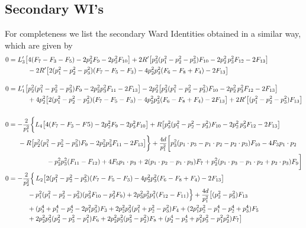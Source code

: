 \documentclass[a4paper,11pt,openright,twoside]{book}
\newcommand{\sdfrac}[2]{\mbox{\small$\displaystyle\frac{#1}{#2}$}}
\numberwithin{equation}{section}
\begin{document}
{{\subsection{Secondary WI's}
For completeness we list the secondary Ward Identities obtained in a similar way, which are given by
\begin{align}
	0&=L'_3\big[4(F_7-F_3-F_5)-2p_2^2F_9-2p_3^2F_{10}\big]+2R'\big[p_3^2(p_1^2-p_2^2-p_3^2)F_{10}-2p_2^2\,p_3^2 F_{12}-2F_{13}\big]\notag\\
	&\hspace{1cm}-2R'\big[2(p_1^2-p_2^2-p_3^2)(F_7-F_5-F_3)-4p_2^2p_3^2(F_6-F_8+F_4)-2F_{13}\big]\\[2.5ex]
	0&=L'_1\big[p_2^2(p_1^2-p_2^2-p_3^2)F_9-2p_2^2p_3^2F_{11}-2F_{13}\big]-2p_2^2\big[p_3^2(p_1^2-p_2^2-p_3^2)F_{10}-2p_2^2\,p_3^2 F_{12}-2F_{13}\big]\notag\\
	&\hspace{1cm}+4p_2^2\big[2(p_1^2-p_2^2-p_3^2)(F_7-F_5-F_3)-4p_2^2p_3^2(F_6-F_8+F_4)-2F_{13}\big]+2R'\big[(p_1^2-p_2^2-p_3^2)F_{13}\big]\notag\\[2.5ex]
\end{align}
\begin{align}
	0&=-\sdfrac{2}{p_1^2}\bigg\{L_4\big[4(F_7-F_3-F5)-2p_2^2F_9-2p_3^2F_{10}\big]+R\big[p_3^2(p_1^2-p_2^2-p_3^2)F_{10}-2p_2^2\,p_3^2 F_{12}-2F_{13}\big]\notag\\
	&\hspace{0.5cm}-R\big[p_2^2(p_1^2-p_2^2-p_3^2)F_9-2p_2^2p_3^2F_{11}-2F_{13}\big]\bigg\}+\sdfrac{4d}{p_1^2}\bigg[p_3^2(p_1\cdot p_3-p_1\cdot p_2-p_2\cdot p_3)F_{10}-4F_3p_1\cdot p_2\notag\\
	&\hspace{2cm}-p_2^2p_3^2(F_{11}-F_{12})+4F_5p_1\cdot p_3+2(p_1\cdot p_2-p_1\cdot p_3)F_7+p_2^2(p_1\cdot p_3-p_1\cdot p_2+p_2\cdot p_3)F_9\bigg]\\
	0&=-\sdfrac{2}{p_2^2}\Big\{\,L_2\big[2(p_1^2-p_2^2-p_3^2)(F_7-F_5-F_3)-4p_2^2p_3^2(F_6-F_8+F_4)-2F_{13}\big]\notag\\
	&\hspace{1cm}-p_1^2(p_1^2-p_2^2-p_3^2)(p_3^2F_{10}-p_2^2F_9)+2p_3^2p_2^2p_1^2(F_{12}-F_{11})\Big\}+\sdfrac{4d}{p_1^2}\big[(p_2^2-p_3^2)F_{13}\notag\\
	&\hspace{1cm}+(p_3^4+p_1^4-p_2^4-2p_1^2p_3^2)F_3+2p_2^2p_3^2(p_1^2+p_2^2-p_3^2)F_4+(2p_1^2p_2^2-p_1^4-p_2^4+p_3^4)F_5\notag\\
	&\hspace{1cm}+2p_2^2p_3^2(p_2^2-p_3^2-p_1^2)F_6+2p_2^2p_3^2(p_3^2-p_2^2)F_8+(p_2^4-p_3^4+p_1^2p_3^2-p_1^2p_2^2)F_7\big]\\[2.5ex]

\end{align}}}
\end{document}
